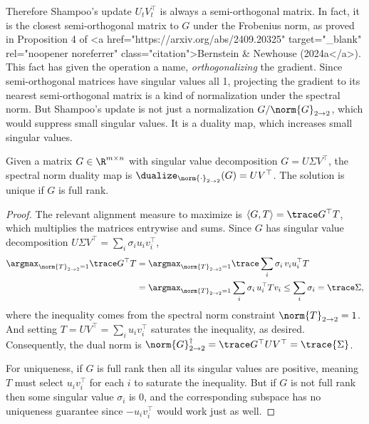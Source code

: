 Therefore Shampoo's update $U_t V_t^\top$ is always a semi-orthogonal matrix. In fact, it is the closest semi-orthogonal matrix to $G$ under the Frobenius norm, as proved in Proposition 4 of <a href="https://arxiv.org/abs/2409.20325" target="_blank" rel="noopener noreferrer" class="citation">Bernstein & Newhouse (2024a</a>). This fact has given the operation a name, \textit{orthogonalizing} the gradient. Since semi-orthogonal matrices have singular values all 1, projecting the gradient to its nearest semi-orthogonal matrix is a kind of normalization under the spectral norm. But Shampoo's update is not just a normalization $G / \norm{G}_{2\to 2}$, which would suppress small singular values. It is a duality map, which increases small singular values.

\begin{theorembox}
    Given a matrix $G \in \R^{m \times n}$ with singular value decomposition $G = U \Sigma V^\top$, the spectral norm duality map is $\dualize_{\norm{\cdot}_{2 \to 2}}(G) = U V^\top$. The solution is unique if $G$ is full rank.
\end{theorembox}

\begin{proof}
    The relevant alignment measure to maximize is $\langle G, T \rangle = \trace G^\top T $, which multiplies the matrices entrywise and sums. Since $G$ has singular value decomposition $U \Sigma V^\top = \sum_i \sigma_i u_i v_i^\top$,
    \begin{align}
        \argmax_{\norm{T}_{2\to 2}=1}\trace G^\top T &= \argmax_{\norm{T}_{2 \to 2}=1} \trace \sum_i \sigma_i \, v_i u_i^\top T \\
        &= \argmax_{\norm{T}_{2 \to 2}=1}\sum_i \sigma_i\, u_i^\top T v_i \leq \sum_i \sigma_i = \trace \Sigma,
    \end{align} where the inequality comes from the spectral norm constraint $\norm{T}_{2 \to 2} = 1$. And setting $T = U V^\top = \sum_i u_i v_i^\top$ saturates the inequality, as desired. Consequently, the dual norm is $\norm{G}_{2 \to 2}^\dagger = \trace G^\top UV^\top = \trace{\Sigma}$.
    
    For uniqueness, if $G$ is full rank then all its singular values are positive, meaning $T$ must select $u_i v_i^\top$ for each $i$ to saturate the inequality. But if $G$ is not full rank then some singular value $\sigma_i$ is 0, and the corresponding subspace has no uniqueness guarantee since $-u_i v_i^\top$ would work just as well.
\end{proof}

